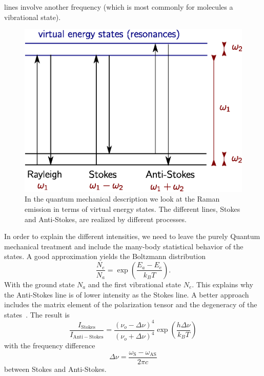 lines involve another frequency (which is most commonly for molecules a vibrational state). 
\begin{figure}[htpb]
\centering
    \includegraphics[width=0.6\linewidth]{figures/qm_states.eps}
    \caption{In the quantum mechanical description we look at the Raman emission in terms of virtual energy states.
    The different lines, Stokes and Anti-Stokes, are realized by different processes.}
\label{fig:qm_states}
\end{figure}
In order to explain
the different intensities, we need to leave the purely Quantum mechanical treatment and include the many-body
statistical behavior of the states. A good approximation yields the Boltzmann distribution
\begin{equation}
    \frac{N_e}{N_a} = \exp\left (\frac{E_a - E_e}{k_B T}\right ).
\end{equation}
With the ground state $N_a$ and the first vibrational state $N_e$. This explains why the Anti-Stokes line
is of lower intensity as the Stokes line. A better approach includes the matrix element of the polarization tensor and
the degeneracy of the states~\cite{ver}. The result is 
\begin{equation}
    \frac{I_{\mathrm{Stokes}}}{I_{\mathrm{Anti-Stokes} }} = \frac{(\nu_o - \Delta \nu)^4}{(\nu_o + \Delta \nu)^4} 
    \exp \left( \frac{h\Delta \nu}{k_BT} \right)
\end{equation}
with the frequency difference 
\begin{equation}
\Delta \nu = \frac{\omega_\mathrm{S} - \omega_{\mathrm{AS}}}{2\pi c} 
\end{equation}
between Stokes and Anti-Stokes.



